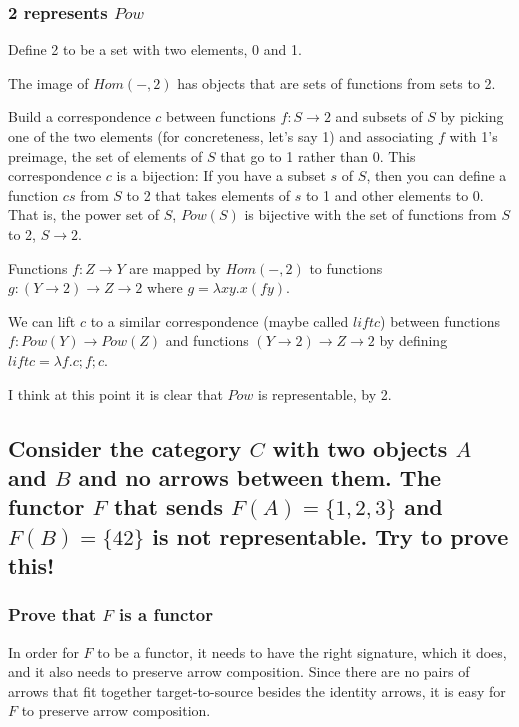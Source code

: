 \documentclass{proc-l}
\theoremstyle{definition}
\theoremstyle{remark}
\numberwithin{equation}{section}
\begin{document}
\subsubsection*{2 represents $Pow$}

Define 2 to be a set with two elements, 0 and 1.

The image of $Hom(-, 2)$ has objects that are sets of functions from sets to 2.

Build a correspondence $c$ between functions $f: S \rightarrow 2$ and subsets of $S$ by picking one of the two elements (for concreteness, let's say 1) and associating $f$ with 1's preimage, the set of elements of $S$ that go to 1 rather than 0. This correspondence $c$ is a bijection: If you have a subset $s$ of $S$, then you can define a function $c s$ from $S$ to 2 that takes elements of $s$ to 1 and other elements to 0. That is, the power set of $S$, $Pow(S)$ is bijective with the set of functions from $S$ to 2, $S \rightarrow 2$.

Functions $f : Z \rightarrow Y$ are mapped by $Hom(-, 2)$ to functions $g: (Y \rightarrow 2) \rightarrow Z \rightarrow 2$ where $g = \lambda x y . x (f y)$.

We can lift $c$ to a similar correspondence (maybe called $lift c$) between functions $f: Pow(Y) \rightarrow Pow(Z)$ and functions $(Y \rightarrow 2) \rightarrow Z \rightarrow 2$ by defining $lift c = \lambda f . c ; f ; c$.

I think at this point it is clear that $Pow$ is representable, by 2.

\subsection*{Consider the category $C$ with two objects $A$ and $B$ and no arrows between them. The functor $F$ that sends $F(A) = \{1,2,3\}$ and $F(B) = \{42\}$ is not representable. Try to prove this!}

\subsubsection*{Prove that $F$ is a functor}

In order for $F$ to be a functor, it needs to have the right signature, which it does, and it also needs to preserve arrow composition. Since there are no pairs of arrows that fit together target-to-source besides the identity arrows, it is easy for $F$ to preserve arrow composition.
\end{document}
